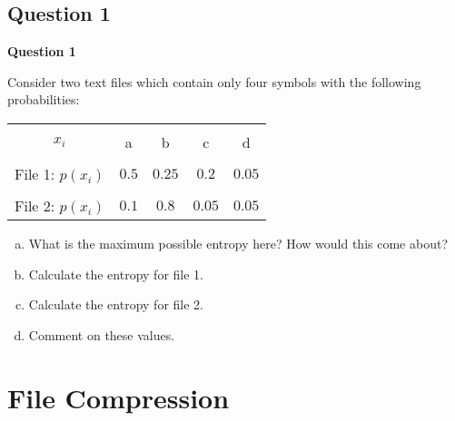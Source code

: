 \documentclass[compress]{beamer}        %
\makeatletter
\newcommand{\tcb}{\textcolor{beamer@blendedblue}}
\makeatother
\begin{document}
\subsection{Question 1}
\begin{frame}{\bf \tcb{Question 1}}

Consider two text files which contain only four symbols with the following probabilities:

\begin{center}
\begin{tabular}{|c|cccc|}
\hline
&&&&\\[-0.3cm]
$x_i$ & a & b & c & d \\[0.1cm]
\hline
&&&&\\[-0.3cm]
File 1: \quad $p(x_i)$ & $0.5$ & $0.25$ & $0.2$ & $0.05$ \\[0.1cm]
\hline
&&&&\\[-0.3cm]
File 2: \quad $p(x_i)$ & $0.1$ & $0.8$ & $0.05$ & $0.05$ \\[0.1cm]
\hline
\end{tabular}
\end{center}

\begin{enumerate}[a)]\itemsep0.3cm
\item What is the maximum possible entropy here? How would this come about?
\item Calculate the entropy for file 1.
\item Calculate the entropy for file 2.
\item Comment on these values.
\end{enumerate}




\end{frame}




\section{File Compression\hspace{0.8cm}}
\end{document}
